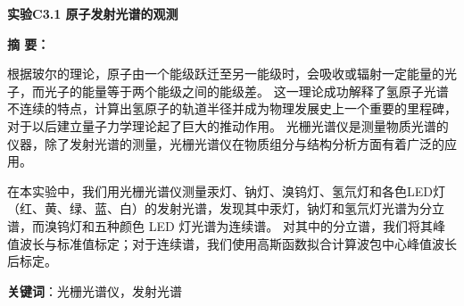 \documentclass[12pt,a4paper,UTF8]{ctexart}
\begin{document}

\begin{center}
\LARGE\textbf{实验C3.1 原子发射光谱的观测}
\end{center}


\doublespacing
	\vspace{4em}
	{\bf 摘{} 要：}
	{ 根据玻尔的理论，原子由一个能级跃迁至另一能级时，会吸收或辐射一定能量的光子，而光子的能量等于两个能级之间的能级差。
	这一理论成功解释了氢原子光谱不连续的特点，计算出氢原子的轨道半径并成为物理发展史上一个重要的里程碑，对于以后建立量子力学理论起了巨大的推动作用。
	光栅光谱仪是测量物质光谱的仪器，除了发射光谱的测量，光栅光谱仪在物质组分与结构分析方面有着广泛的应用。
	
	在本实验中，我们用光栅光谱仪测量汞灯、钠灯、溴钨灯、氢氘灯和各色LED灯（红、黄、绿、蓝、白）的发射光谱，发现其中汞灯，钠灯和氢氘灯光谱为分立谱，而溴钨灯和五种颜色 LED 灯光谱为连续谱。
	对其中的分立谱，我们将其峰值波长与标准值标定；对于连续谱，我们使用高斯函数拟合计算波包中心峰值波长后标定。

	}
	\par%
	\textbf{关键词}：光栅光谱仪，发射光谱
	\vspace{3em}

\newpage
\end{document}
